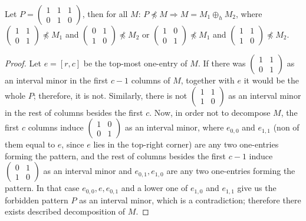 \documentclass[12pt,a4paper]{report}
\begin{document}
\begin{lemma}
\label{lemma2}
Let $P=\left(\begin{smallmatrix}1&1&1\\0&1&0\end{smallmatrix}\right)$, then for all $M$: $P\not\preceq M\Rightarrow M=M_1\oplus_hM_2$, where $\left(\begin{smallmatrix}1&1\\0&1\end{smallmatrix}\right)\not\preceq M_1$ and $\left(\begin{smallmatrix}0&1\\1&0\end{smallmatrix}\right)\not\preceq M_2$ or $\left(\begin{smallmatrix}1&0\\0&1\end{smallmatrix}\right)\not\preceq M_1$ and $\left(\begin{smallmatrix}1&1\\1&0\end{smallmatrix}\right)\not\preceq M_2$.
\end{lemma}
\begin{proof}
Let $e=[r,c]$ be the top-most one-entry of $M$. If there was $\left(\begin{smallmatrix}1&1\\0&1\end{smallmatrix}\right)$ as an interval minor in the first $c-1$ columns of $M$, together with $e$ it would be the whole $P$; therefore, it is not. Similarly, there is not $\left(\begin{smallmatrix}1&1\\1&0\end{smallmatrix}\right)$ as an interval minor in the rest of columns besides the first $c$. Now, in order not to decompose $M$, the first $c$ columns induce $\left(\begin{smallmatrix}1&0\\0&1\end{smallmatrix}\right)$ as an interval minor, where $e_{0,0}$ and $e_{1,1}$ (non of them equal to $e$, since $e$ lies in the top-right corner) are any two one-entries forming the pattern, and the rest of columns besides the first $c-1$ induce $\left(\begin{smallmatrix}0&1\\1&0\end{smallmatrix}\right)$ as an interval minor and $e_{0,1},e_{1,0}$ are any two one-entries forming the pattern. In that case $e_{0,0},e,e_{0,1}$ and a lower one of $e_{1,0}$ and $e_{1,1}$ give us the forbidden pattern $P$ as an interval minor, which is a contradiction; therefore there exists described decomposition of $M$.
\end{proof}
\end{document}
